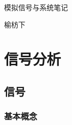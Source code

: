 \documentclass[UTF8,fontset=fandol,zihao=5]{ctexart}
\begin{document}
\begin{center}
  {\heiti\headingfont{}\color{main} 模拟信号与系统笔记}
\end{center}

\begin{center}
  {\kaishu{}\color{black} 榆枋下}
\end{center}

\section{信号分析}

\subsection{信号}

\subsubsection{基本概念}
\end{document}

